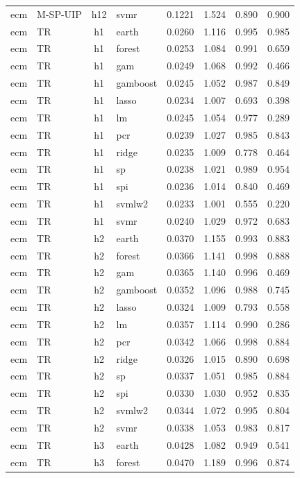 \begin{ThreePartTable}
\begin{longtable}[t]{llclcccc}
ecm & M-SP-UIP & h12 & svmr & 0.1221 & 1.524 & 0.890 & 0.900\\
\addlinespace
ecm & TR & h1 & earth & 0.0260 & 1.116 & 0.995 & 0.985\\
ecm & TR & h1 & forest & 0.0253 & 1.084 & 0.991 & 0.659\\
ecm & TR & h1 & gam & 0.0249 & 1.068 & 0.992 & 0.466\\
ecm & TR & h1 & gamboost & 0.0245 & 1.052 & 0.987 & 0.849\\
ecm & TR & h1 & lasso & 0.0234 & 1.007 & 0.693 & 0.398\\
ecm & TR & h1 & lm & 0.0245 & 1.054 & 0.977 & 0.289\\
ecm & TR & h1 & pcr & 0.0239 & 1.027 & 0.985 & 0.843\\
ecm & TR & h1 & ridge & 0.0235 & 1.009 & 0.778 & 0.464\\
ecm & TR & h1 & sp & 0.0238 & 1.021 & 0.989 & 0.954\\
ecm & TR & h1 & spi & 0.0236 & 1.014 & 0.840 & 0.469\\
ecm & TR & h1 & svmlw2 & 0.0233 & 1.001 & 0.555 & 0.220\\
ecm & TR & h1 & svmr & 0.0240 & 1.029 & 0.972 & 0.683\\
\addlinespace
ecm & TR & h2 & earth & 0.0370 & 1.155 & 0.993 & 0.883\\
ecm & TR & h2 & forest & 0.0366 & 1.141 & 0.998 & 0.888\\
ecm & TR & h2 & gam & 0.0365 & 1.140 & 0.996 & 0.469\\
ecm & TR & h2 & gamboost & 0.0352 & 1.096 & 0.988 & 0.745\\
ecm & TR & h2 & lasso & 0.0324 & 1.009 & 0.793 & 0.558\\
ecm & TR & h2 & lm & 0.0357 & 1.114 & 0.990 & 0.286\\
ecm & TR & h2 & pcr & 0.0342 & 1.066 & 0.998 & 0.884\\
ecm & TR & h2 & ridge & 0.0326 & 1.015 & 0.890 & 0.698\\
ecm & TR & h2 & sp & 0.0337 & 1.051 & 0.985 & 0.884\\
ecm & TR & h2 & spi & 0.0330 & 1.030 & 0.952 & 0.835\\
ecm & TR & h2 & svmlw2 & 0.0344 & 1.072 & 0.995 & 0.804\\
ecm & TR & h2 & svmr & 0.0338 & 1.053 & 0.983 & 0.817\\
\addlinespace
ecm & TR & h3 & earth & 0.0428 & 1.082 & 0.949 & 0.541\\
ecm & TR & h3 & forest & 0.0470 & 1.189 & 0.996 & 0.874\\

\end{longtable}
\end{ThreePartTable}
